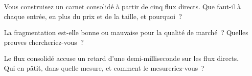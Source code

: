 \begin{interviewq}\label{iq:mx:fragmentation-and-routing:4}
Vous construisez un carnet consolidé à partir de cinq flux directs. Que faut-il à chaque entrée, en plus du prix et de la taille, et pourquoi~?
\end{interviewq}

\begin{interviewq}\label{iq:mx:fragmentation-and-routing:5}
La fragmentation est-elle bonne ou mauvaise pour la qualité de marché~? Quelles preuves chercheriez-vous~?
\end{interviewq}

\begin{interviewq}\label{iq:mx:fragmentation-and-routing:6}
Le flux consolidé accuse un retard d'une demi-milliseconde sur les flux directs. Qui en pâtit, dans quelle mesure, et comment le mesureriez-vous~?
\end{interviewq}
